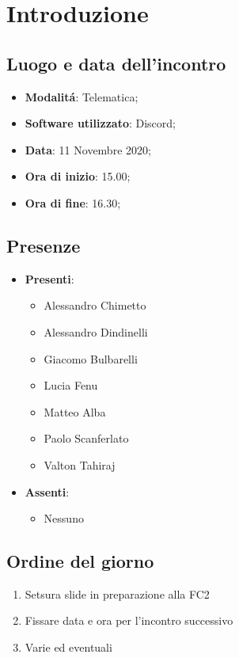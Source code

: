 \documentclass[]{article}
\begin{document}
	
	
	
	\newpage
	
	
	\section{Introduzione}
	\subsection{Luogo e data dell'incontro}
	\begin{itemize}
		\item \textbf{Modalitá}: Telematica;
		\item \textbf{Software utilizzato}: Discord;
		\item \textbf{Data}: 11 Novembre 2020;
		\item \textbf{Ora di inizio}: 15.00;
		\item \textbf{Ora di fine}: 16.30;
	\end{itemize}
	
	\subsection{Presenze}
	\begin{itemize}
		\item \textbf{Presenti}: 
		\begin{itemize}
			\item Alessandro Chimetto
			\item Alessandro Dindinelli
			\item Giacomo Bulbarelli
			\item Lucia Fenu
			\item Matteo Alba
			\item Paolo Scanferlato
			\item Valton Tahiraj
		\end{itemize}
		\item \textbf{Assenti}:
		\begin{itemize}
			\item Nessuno
		\end{itemize}
	\end{itemize}
	
	\subsection{Ordine del giorno}
	\begin{enumerate}
		\item Setsura slide in preparazione alla FC2 
		\item Fissare data e ora per l'incontro successivo
		\item Varie ed eventuali
	\end{enumerate}
	
\end{document}
